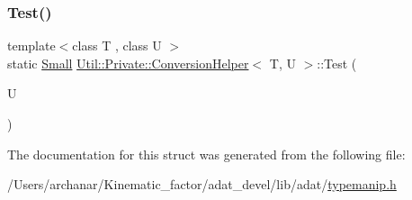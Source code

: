 \mbox{\label{structUtil_1_1Private_1_1ConversionHelper_aeee49a75a44a57a9fec054caca088db9}} 
\subsubsection{\texorpdfstring{Test()}{Test()}\hspace{0.1cm}{\footnotesize\ttfamily [4/4]}}
{\footnotesize\ttfamily template$<$class T , class U $>$ \\
static \mbox{\hyperlink{structUtil_1_1Private_1_1ConversionHelper_aaaf6583019b5246d4676b56923632385}{Small}} \mbox{\hyperlink{structUtil_1_1Private_1_1ConversionHelper}{Util\+::\+Private\+::\+Conversion\+Helper}}$<$ T, U $>$\+::Test (\begin{DoxyParamCaption}\item[{U}]{ }\end{DoxyParamCaption})\hspace{0.3cm}{\ttfamily [static]}}



The documentation for this struct was generated from the following file\+:\begin{DoxyCompactItemize}
\item 
/\+Users/archanar/\+Kinematic\+\_\+factor/adat\+\_\+devel/lib/adat/\mbox{\hyperlink{lib_2adat_2typemanip_8h}{typemanip.\+h}}\end{DoxyCompactItemize}
